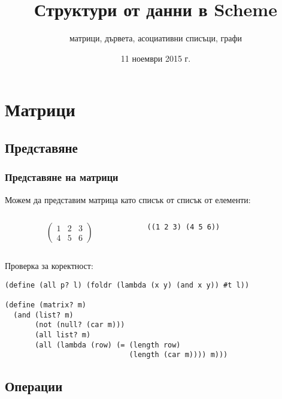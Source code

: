 \documentclass{beamer}
\title{Структури от данни в Scheme}
\subtitle{матрици, дървета, асоциативни списъци, графи}
\date{11 ноември 2015 г.}
\begin{document}
\begin{frame}
  \titlepage
\end{frame}

\section{Матрици}

\subsection{Представяне}

\begin{frame}[fragile]
  \frametitle{Представяне на матрици}
  Можем да представим матрица като списък от списък от елементи:

  \begin{columns}[t,onlytextwidth]
    \begin{column}{0.5\textwidth}
      \begin{equation*}
        \left(
          \begin{array}{ccc}
            1 & 2 & 3\\
            4 & 5 & 6
          \end{array}
        \right)
      \end{equation*}
    \end{column}
    \begin{column}{0.5\textwidth}

      \tt{((1 2 3) (4 5 6))}
    \end{column}
  \end{columns}
  \vspace{1em}
  Проверка за коректност:
  \pause
\begin{verbatim}
(define (all p? l) (foldr (lambda (x y) (and x y)) #t l))

(define (matrix? m)
  (and (list? m)
       (not (null? (car m)))
       (all list? m)
       (all (lambda (row) (= (length row)
                             (length (car m)))) m)))
\end{verbatim}
\end{frame}

\subsection{Операции}
\end{document}
